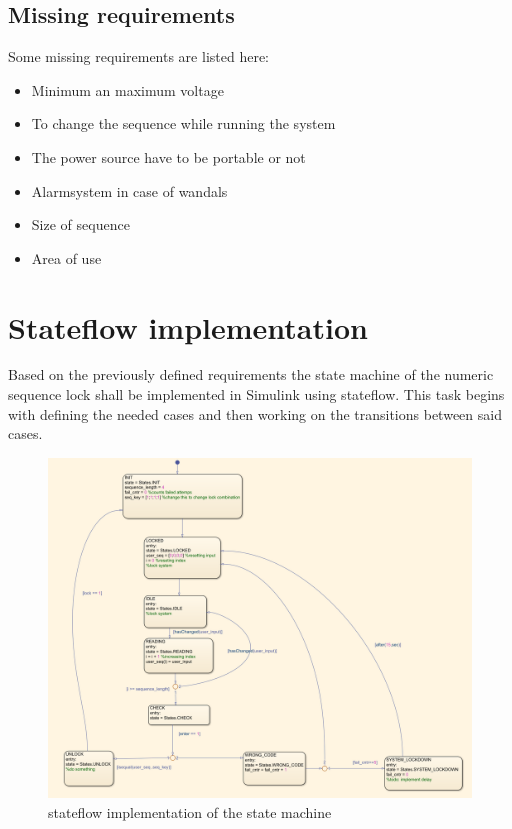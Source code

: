 	\subsection{Missing requirements}\label{subsec:missing}
	Some missing requirements are listed here:
	\begin{itemize}
		\item Minimum an maximum voltage
		\item To change the sequence while running the system
		\item The power source have to be portable or not
		\item Alarmsystem in case of wandals
		\item Size of sequence
		\item Area of use
	\end{itemize}

	\section{Stateflow implementation}
	Based on the previously defined requirements the state machine of the numeric sequence lock shall be implemented in Simulink using stateflow. This task begins with defining the needed cases and then working on the transitions between said cases.
		\begin{figure}[H]
				\centering
				\includegraphics[width=1\textwidth]{figures/stateflow.png}
				\caption{stateflow implementation of the state machine}
				\label{fig:state}
		\end{figure} 

